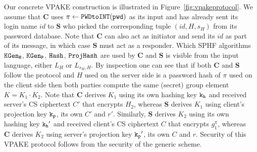 Our concrete VPAKE construction is illustrated in Figure~\ref{fig:vpakeprotocol}. 
We assume that $\bm{C}$ uses $\pi\gets\texttt{PWDtoINT}(\mathtt{pwd})$ as its input and has already sent its login name $id$ to $\bm{S}$ who picked the corresponding tuple $(id,H,s_H)$ from its password database. 
Note that $\bm{C}$ can also act as initiator and send its $id$ as part of its message, in which case $\bm{S}$ must act as a responder. 
Which SPHF algorithms $\mathtt{KGen_H}$, $\mathtt{KGen_P}$, $\mathtt{Hash}$, $\mathtt{ProjHash}$ are used by $\bm{C}$ and $\bm{S}$ is visible from the input language, either $L_H$ or $L_{s_H,H}$. 
By inspection one can see that if both $\bm{C}$ and $\bm{S}$ follow the protocol and $H$ used on the server side is a password hash of $\pi$ used on the client side then both parties compute the same (secret) group element $K=K_1\cdot K_2$. 
Note that $\bm{C}$ derives $K_1$ using its own hashing key $\mathtt{k_h}$ and received server's CS ciphertext $C'$ that encrypts $H_2$, whereas $\bm{S}$ derives $K_1$ using client's projection key $\mathtt{k_p}$, its own $C'$ and $r'$. 
Similarly, $\bm{S}$ derives $K_2$ using its own hashing key $\mathtt{k_h}'$ and received client's CS ciphertext $C$ that encrypts $g_1^\pi$, whereas $\bm{C}$ derives $K_2$ using server's projection key $\mathtt{k_p}'$, its own $C$ and $r$. Security of this VPAKE protocol follows from the security of the generic scheme.


